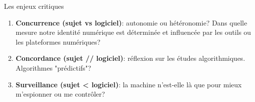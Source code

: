 \begin{frame}{Les enjeux critiques}
\begin{enumerate}
    \item \textbf{Concurrence (sujet vs logiciel)}: autonomie ou hétéronomie? Dans quelle mesure notre identité numérique est déterminée et influencée par les outils ou les plateformes numériques?
    \item \textbf{Concordance (sujet // logiciel)}: réflexion sur les études algorithmiques. Algorithmes "prédictifs"?
    \item \textbf{Surveillance (sujet < logiciel)}: la machine n'est-elle là que pour mieux m'espionner ou me contrôler? 
\end{enumerate}

\end{frame}